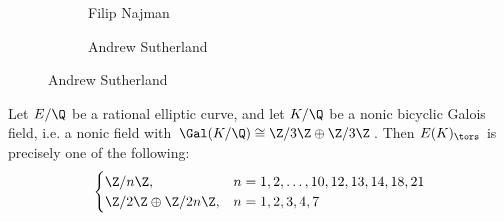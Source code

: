 \begin{frame}[plain]
\begin{figure}[h]
\begin{subfigure}{0.23\textwidth}
	\caption{\scriptsize Filip Najman}
	\end{subfigure}
	\begin{subfigure}{0.23\textwidth}
	\captionsetup{labelformat=empty}
	\centering
	\caption{\scriptsize Andrew Sutherland}
	\end{subfigure}
	\end{figure}
\end{frame}





\begin{frame}[plain]
\begin{thm}
Let $E/\Q$ be a rational elliptic curve, and let $K/\Q$ be a nonic bicyclic Galois field, i.e. a nonic field with $\Gal(K/\Q) \cong \Z/3\Z \oplus \Z/3\Z$. Then $E(K)_\tors$ is precisely one of the following:
	\[
	\begin{cases}
	\Z/n\Z, & n= 1, 2, \ldots, 10, 12, 13, 14, 18, 21 \\
	\Z/2\Z \oplus \Z/2n\Z, & n= 1, 2, 3, 4, 7
	\end{cases}
	\]
\end{thm}
\end{frame}





